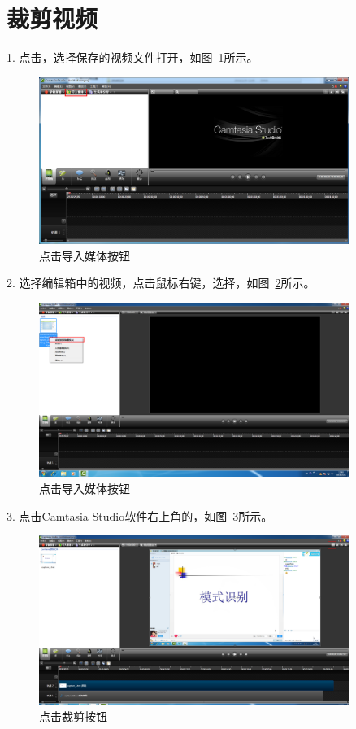 \documentclass[12pt]{article}
\begin{document}
\section{裁剪视频}
1. 点击{\color{blue}{导入媒体}}，选择保存的视频文件打开，如图~\ref{fig:addFig1}所示。\par
 \begin{figure}
    \centering
    \includegraphics[width=0.9\textwidth]{addFig1.png}
    \caption{点击导入媒体按钮}
    \label{fig:addFig1}
    \end{figure}
2. 选择编辑箱中的视频，点击鼠标右键，选择{\color{blue}{添加到时间轴播放}}，如图~\ref{fig:addFig2}所示。\par
 \begin{figure}
    \centering
    \includegraphics[width=0.9\textwidth]{addFig2.png}
    \caption{点击导入媒体按钮}
    \label{fig:addFig2}
    \end{figure}
3. 点击Camtasia Studio软件右上角的{\color{blue}{裁剪按钮}}，如图~\ref{fig:fig11}所示。\par
     \begin{figure}
    \centering
    \includegraphics[width=0.9\textwidth]{fig11.png}
    \caption{点击裁剪按钮}
    \label{fig:fig11}
    \end{figure}
\end{document}
